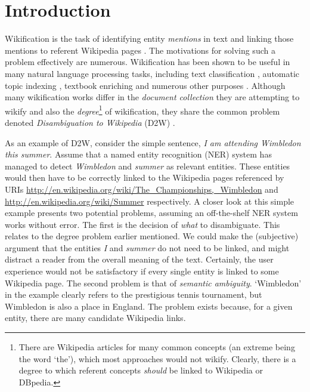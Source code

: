 \documentclass[runningheads,a4paper]{llncs}
\begin{document}
\section{Introduction}

Wikification is the task of identifying entity \emph{mentions} in text and linking those mentions to referent Wikipedia pages \cite{wikification}. The motivations for solving such a problem effectively are numerous. Wikification has been shown to be useful in many natural language processing tasks, including text classification \cite{use1}, automatic topic indexing \cite{use3}, textbook enriching \cite{use2} and numerous other purposes \cite{kulkarni}. Although many wikification works differ in the \emph{document collection} they are attempting to wikify and also the \emph{degree}\footnote{There are Wikipedia articles for many common concepts (an extreme being the word `the'), which most approaches would not wikify. Clearly, there is a degree to which referent concepts \emph{should} be linked to Wikipedia or DBpedia.} of wikification, they share the common problem denoted \emph{Disambiguation to Wikipedia} (D2W) \cite{roth}. 

As an example of D2W, consider the simple sentence, \emph{I am attending Wimbledon this summer}. Assume that a named entity recognition (NER) \cite{ner} system has managed to detect \emph{Wimbledon} and \emph{summer} as relevant entities. These entities would then have to be correctly linked to the Wikipedia pages referenced by URIs \url{http://en.wikipedia.org/wiki/The_Championships,_Wimbledon} and \url{http://en.wikipedia.org/wiki/Summer} respectively. A closer look at this simple example presents two potential problems, assuming an off-the-shelf NER system works without error. The first is the decision of \emph{what} to disambiguate. This relates to the degree problem earlier mentioned. We could make the (subjective) argument that the entities \emph{I} and \emph{summer} do not need to be linked, and might distract a reader from the overall meaning of the text. Certainly, the user experience would not be satisfactory if every single entity is linked to some Wikipedia page. The second problem is that of \emph{semantic ambiguity}. `Wimbledon' in the example clearly refers to the prestigious tennis tournament, but Wimbledon is also a place in England. The problem exists because, for a given entity, there are many candidate Wikipedia links. 
\end{document}
